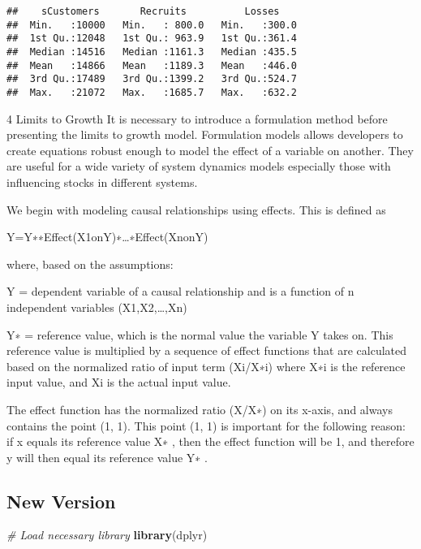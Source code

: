 \documentclass[
]{article}
\newenvironment{Shaded}{\begin{snugshade}}{\end{snugshade}}
\newcommand{\CommentTok}[1]{\textcolor[rgb]{0.56,0.35,0.01}{\textit{#1}}}
\newcommand{\FunctionTok}[1]{\textcolor[rgb]{0.13,0.29,0.53}{\textbf{#1}}}
\newcommand{\NormalTok}[1]{#1}
\begin{document}
\begin{verbatim}
##    sCustomers       Recruits          Losses     
##  Min.   :10000   Min.   : 800.0   Min.   :300.0  
##  1st Qu.:12048   1st Qu.: 963.9   1st Qu.:361.4  
##  Median :14516   Median :1161.3   Median :435.5  
##  Mean   :14866   Mean   :1189.3   Mean   :446.0  
##  3rd Qu.:17489   3rd Qu.:1399.2   3rd Qu.:524.7  
##  Max.   :21072   Max.   :1685.7   Max.   :632.2
\end{verbatim}

4 Limits to Growth It is necessary to introduce a formulation method
before presenting the limits to growth model. Formulation models allows
developers to create equations robust enough to model the effect of a
variable on another. They are useful for a wide variety of system
dynamics models especially those with influencing stocks in different
systems.

We begin with modeling causal relationships using effects. This is
defined as

Y=Y∗∗Effect(X1onY)∗\ldots∗Effect(XnonY)

where, based on the assumptions:

Y = dependent variable of a causal relationship and is a function of n
independent variables (X1,X2,\ldots,Xn)

Y∗ = reference value, which is the normal value the variable Y takes on.
This reference value is multiplied by a sequence of effect functions
that are calculated based on the normalized ratio of input term (Xi/X∗i)
where X∗i is the reference input value, and Xi is the actual input
value.

The effect function has the normalized ratio (X/X∗) on its x-axis, and
always contains the point (1, 1). This point (1, 1) is important for the
following reason: if x equals its reference value X∗ , then the effect
function will be 1, and therefore y will then equal its reference value
Y∗ .

\subsection{New Version}\label{new-version}

\begin{Shaded}
\begin{Highlighting}[]
\CommentTok{\# Load necessary library}
\FunctionTok{library}\NormalTok{(dplyr)}
\end{Highlighting}
\end{Shaded}
\end{document}
